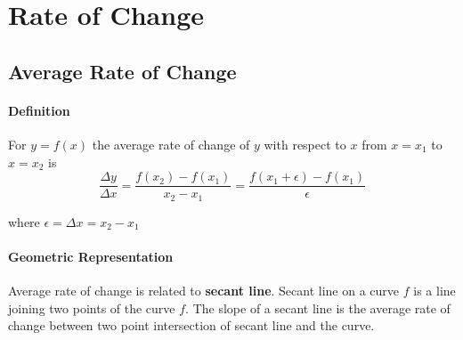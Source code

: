 \documentclass[12pt]{article}
\begin{document}
\section{Rate of Change}
\subsection{Average Rate of Change}
\paragraph{Definition} For $y = f(x)$ the average rate of change of $y$ with respect to $x$ from $x = x_1$ to $x = x_2$ is 
\[
    \frac{\Delta y}{\Delta x} = \frac{f(x_2) - f(x_1)}{x_2 - x_1} = \frac{f(x_1 + \epsilon) - f(x_1)}{\epsilon}
\]
\begin{center}
    where $\epsilon = \Delta x = x_2 - x_1$
\end{center}
\paragraph{Geometric Representation} Average rate of change is related to \textbf{secant line}. 
Secant line on a curve $f$ is a line joining two points of the curve $f$. The slope of a secant line
is the average rate of change between two point intersection of secant line and the curve.

\vspace*{1cm}
\end{document}
